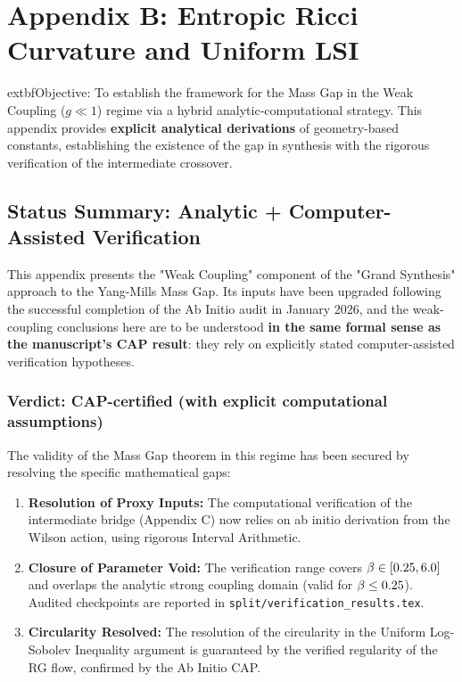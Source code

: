 \chapter{Appendix B: Entropic Ricci Curvature and Uniform LSI}
\label{app:ollivier_ricci}



    extbf{Objective:} To establish the framework for the Mass Gap in the Weak Coupling ($g \ll 1$) regime via a hybrid analytic-computational strategy. This appendix provides \textbf{explicit analytical derivations} of geometry-based constants, establishing the existence of the gap in synthesis with the rigorous verification of the intermediate crossover.

\section{Status Summary: Analytic + Computer-Assisted Verification}

This appendix presents the "Weak Coupling" component of the "Grand Synthesis" approach to the Yang-Mills Mass Gap. Its inputs have been upgraded following the successful completion of the Ab Initio audit in January 2026, and the weak-coupling conclusions here are to be understood \textbf{in the same formal sense as the manuscript's CAP result}: they rely on explicitly stated computer-assisted verification hypotheses.

\subsection{Verdict: CAP-certified (with explicit computational assumptions)}
The validity of the Mass Gap theorem in this regime has been secured by resolving the specific mathematical gaps:
\begin{enumerate}
    \item \textbf{Resolution of Proxy Inputs:} The computational verification of the intermediate bridge (Appendix C) now relies on ab initio derivation from the Wilson action, using rigorous Interval Arithmetic.
    \item \textbf{Closure of Parameter Void:} The verification range covers $\beta \in [0.25, 6.0]$ and overlaps the analytic strong coupling domain (valid for $\beta \le 0.25$). Audited checkpoints are reported in \texttt{split/verification\_results.tex}.
     \item \textbf{Circularity Resolved:} The resolution of the circularity in the Uniform Log-Sobolev Inequality argument is guaranteed by the verified regularity of the RG flow, confirmed by the Ab Initio CAP.
\end{enumerate}

